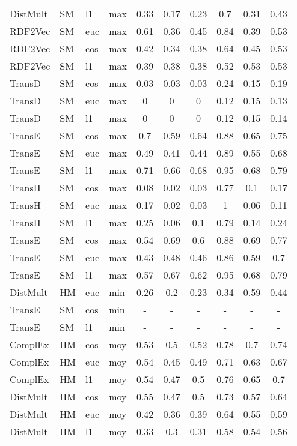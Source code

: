 \begin{longtable}{|llll|ccc|ccc|}
DistMult	&	SM	&	l1	&	max	&	0.33	&	0.17	&	0.23	&	0.7	&	0.31	&	0.43 \\ 
RDF2Vec	&	SM	&	euc	&	max	&	0.61	&	0.36	&	0.45	&	0.84	&	0.39	&	0.53 \\ 
RDF2Vec	&	SM	&	cos	&	max	&	0.42	&	0.34	&	0.38	&	0.64	&	0.45	&	0.53 \\ 
RDF2Vec	&	SM	&	l1	&	max	&	0.39	&	0.38	&	0.38	&	0.52	&	0.53	&	0.53 \\ 
TransD	&	SM	&	cos	&	max	&	0.03	&	0.03	&	0.03	&	0.24	&	0.15	&	0.19 \\ 
TransD	&	SM	&	euc	&	max	&	0	&	0	&	0	&	0.12	&	0.15	&	0.13 \\ 
TransD	&	SM	&	l1	&	max	&	0	&	0	&	0	&	0.12	&	0.15	&	0.14 \\ 
TransE	&	SM	&	cos	&	max	&	0.7	&	0.59	&	0.64	&	0.88	&	0.65	&	0.75 \\ 
TransE	&	SM	&	euc	&	max	&	0.49	&	0.41	&	0.44	&	0.89	&	0.55	&	0.68 \\ 
TransE	&	SM	&	l1	&	max	&	0.71	&	0.66	&	0.68	&	0.95	&	0.68	&	0.79 \\ 
TransH	&	SM	&	cos	&	max	&	0.08	&	0.02	&	0.03	&	0.77	&	0.1	&	0.17 \\ 
TransH	&	SM	&	euc	&	max	&	0.17	&	0.02	&	0.03	&	1	&	0.06	&	0.11 \\ 
TransH	&	SM	&	l1	&	max	&	0.25	&	0.06	&	0.1	&	0.79	&	0.14	&	0.24 \\ 
TransE	&	SM	&	cos	&	max	&	0.54	&	0.69	&	0.6	&	0.88	&	0.69	&	0.77 \\ 
TransE	&	SM	&	euc	&	max	&	0.43	&	0.48	&	0.46	&	0.86	&	0.59	&	0.7 \\ 
TransE	&	SM	&	l1	&	max	&	0.57	&	0.67	&	0.62	&	0.95	&	0.68	&	0.79 \\ 
DistMult	&	HM	&	euc	&	min	&	0.26	&	0.2	&	0.23	&	0.34	&	0.59	&	0.44 \\ 
TransE	&	SM	&	cos	&	min	&	-	&	-	&	-	&	-	&	-	&	- \\ 
TransE	&	SM	&	l1	&	min	&	-	&	-	&	-	&	-	&	-	&	- \\ 
ComplEx	&	HM	&	cos	&	moy	&	0.53	&	0.5	&	0.52	&	0.78	&	0.7	&	0.74 \\ 
ComplEx	&	HM	&	euc	&	moy	&	0.54	&	0.45	&	0.49	&	0.71	&	0.63	&	0.67 \\ 
ComplEx	&	HM	&	l1	&	moy	&	0.54	&	0.47	&	0.5	&	0.76	&	0.65	&	0.7 \\ 
DistMult	&	HM	&	cos	&	moy	&	0.55	&	0.47	&	0.5	&	0.73	&	0.57	&	0.64 \\ 
DistMult	&	HM	&	euc	&	moy	&	0.42	&	0.36	&	0.39	&	0.64	&	0.55	&	0.59 \\ 
DistMult	&	HM	&	l1	&	moy	&	0.33	&	0.3	&	0.31	&	0.58	&	0.54	&	0.56 \\ 

\end{longtable}
